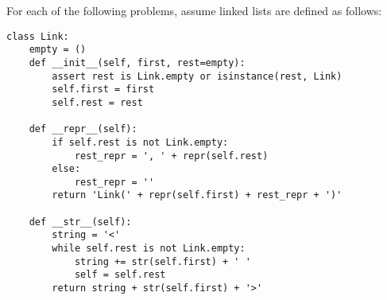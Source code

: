 For each of the following problems, assume linked lists are defined as follows:
\begin{lstlisting}
class Link:
    empty = ()
    def __init__(self, first, rest=empty):
        assert rest is Link.empty or isinstance(rest, Link)
        self.first = first
        self.rest = rest

    def __repr__(self):
        if self.rest is not Link.empty:
            rest_repr = ', ' + repr(self.rest)
        else:
            rest_repr = ''
        return 'Link(' + repr(self.first) + rest_repr + ')'

    def __str__(self):
        string = '<'
        while self.rest is not Link.empty:
            string += str(self.first) + ' '
            self = self.rest
        return string + str(self.first) + '>'   
\end{lstlisting}